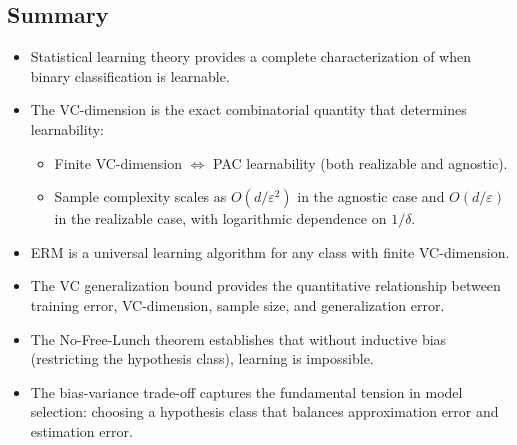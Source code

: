 \subsection*{Summary}
\begin{itemize}
    \item Statistical learning theory provides a complete characterization of when binary classification is learnable.
    \item The VC-dimension is the exact combinatorial quantity that determines learnability:
    \begin{itemize}
        \item Finite VC-dimension $\iff$ PAC learnability (both realizable and agnostic).
        \item Sample complexity scales as $O(d/\varepsilon^2)$ in the agnostic case and $O(d/\varepsilon)$ in the realizable case, with logarithmic dependence on $1/\delta$.
    \end{itemize}
    \item ERM is a universal learning algorithm for any class with finite VC-dimension.
    \item The VC generalization bound provides the quantitative relationship between training error, VC-dimension, sample size, and generalization error.
    \item The No-Free-Lunch theorem establishes that without inductive bias (restricting the hypothesis class), learning is impossible.
    \item The bias-variance trade-off captures the fundamental tension in model selection: choosing a hypothesis class that balances approximation error and estimation error.
\end{itemize}
